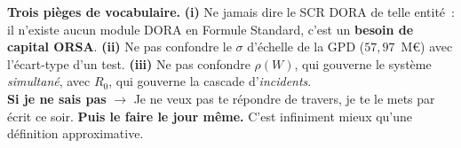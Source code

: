 \documentclass[9pt,a4paper]{article}
\begin{document}
\vspace{2pt}
\begin{alerte}
\footnotesize
\textbf{Trois pièges de vocabulaire.}
\textbf{(i)} Ne jamais dire \og le SCR DORA de telle entité\fg~: il n'existe aucun module
DORA en Formule Standard, c'est un \textbf{besoin de capital ORSA}.
\textbf{(ii)} Ne pas confondre le $\sigma$ d'échelle de la GPD ($57{,}97$~M\euro) avec
l'écart-type d'un test.
\textbf{(iii)} Ne pas confondre $\rho(W)$, qui gouverne le système \emph{simultané}, avec
$R_0$, qui gouverne la cascade d'\emph{incidents}.\\[3pt]
\textbf{Si je ne sais pas} $\rightarrow$ \og Je ne veux pas te répondre de travers, je te le
mets par écrit ce soir.\fg{} \textbf{Puis le faire le jour même.} C'est infiniment mieux
qu'une définition approximative.
\end{alerte}
\end{document}
